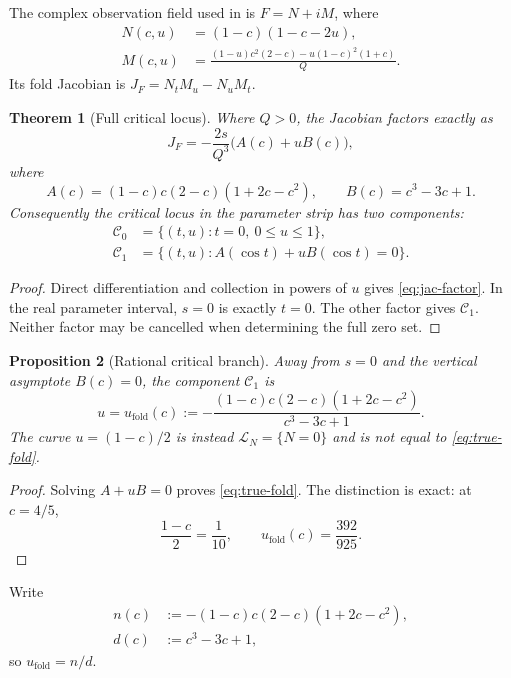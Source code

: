 \documentclass[11pt]{article}
\newtheorem{theorem}{Theorem}[section]
\newtheorem{proposition}[theorem]{Proposition}
\theoremstyle{definition}
\newcommand{\LN}{\mathcal L_N}
\newcommand{\Csym}{\mathcal C_0}
\newcommand{\Crat}{\mathcal C_1}
\begin{document}
The complex observation field used in \cite{hayami2026surface} is
$F=N+iM$, where
\begin{align}
N(c,u)&=(1-c)(1-c-2u),\\
M(c,u)&=
\frac{(1-u)c^2(2-c)-u(1-c)^2(1+c)}{Q}.
\end{align}
Its fold Jacobian is
$J_F=N_tM_u-N_uM_t$.

\begin{theorem}[Full critical locus]\label{thm:full-critical}
Where $Q>0$, the Jacobian factors exactly as
\begin{equation}\label{eq:jac-factor}
J_F=-\frac{2s}{Q^3}\bigl(A(c)+uB(c)\bigr),
\end{equation}
where
\[
A(c)=(1-c)c(2-c)(1+2c-c^2),
\qquad
B(c)=c^3-3c+1.
\]
Consequently the critical locus in the parameter strip has two components:
\begin{align}
\Csym&=\{(t,u):t=0,\ 0\leq u\leq1\},\\
\Crat&=\{(t,u):A(\cos t)+uB(\cos t)=0\}.
\end{align}
\end{theorem}

\begin{proof}
Direct differentiation and collection in powers of $u$ gives
\eqref{eq:jac-factor}.  In the real parameter interval, $s=0$ is exactly
$t=0$.  The other factor gives $\Crat$.  Neither factor may be cancelled when
determining the full zero set.
\end{proof}

\begin{proposition}[Rational critical branch]\label{thm:true-fold}
Away from $s=0$ and the vertical asymptote $B(c)=0$, the component
$\Crat$ is
\begin{equation}\label{eq:true-fold}
u=u_{\mathrm{fold}}(c):=
-\frac{(1-c)c(2-c)(1+2c-c^2)}
       {c^3-3c+1}.
\end{equation}
The curve $u=(1-c)/2$ is instead $\LN=\{N=0\}$ and is not equal to
\eqref{eq:true-fold}.
\end{proposition}

\begin{proof}
Solving $A+uB=0$ proves \eqref{eq:true-fold}.  The distinction is exact:
at $c=4/5$,
\[
\frac{1-c}{2}=\frac1{10},
\qquad
u_{\mathrm{fold}}(c)=\frac{392}{925}.
\]
\end{proof}

Write
\begin{align}
n(c)&:=-(1-c)c(2-c)(1+2c-c^2),\\
d(c)&:=c^3-3c+1,
\end{align}
so $u_{\mathrm{fold}}=n/d$.
\end{document}
